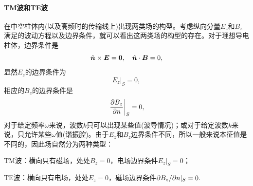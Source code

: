 \paragraph{TM波和TE波}
在中空柱体内(以及高频时的传输线上)出现两类场的构型。考虑纵向分量$E_z$和$B_z$满足的波动方程以及边界条件，就可以看出这两类场的构型的存在。对于理想导电柱体，边界条件是
\[
    \mathop{}\!\hat{\bm n}\times\bm E=\bm0,\quad\mathop{}\!\hat{\bm n}\cdot\bm B=0,
\]
显然$E_z$的边界条件为
\begin{equation}
    E_z|_S=0,
\end{equation}
相应的$B_z$的边界条件是
\begin{equation}
    \left.\frac{\partial^{\;\!\!}B_z}{\partial n^{\;\!\!}}\right\rvert_S=0,
\end{equation}
对于给定频率$\omega$来说，波数$k$只可以出现某些值(波导情况)；或对于给定波数$k$来说，只允许某些$\omega$值(谐振腔)。由于$E_z$和$B_z$边界条件不同，所以一般来说本征值是不同的，因此场自然分为两种类型：
\begin{compactitem}
	\item TM波：横向只有磁场，处处$B_z=0$，电场边界条件$E_z|_S=0$；
	\item TE波：横向只有电场，处处$E_z=0$，磁场边界条件$\partial B_z/\partial n|_S=0.$
\end{compactitem}
